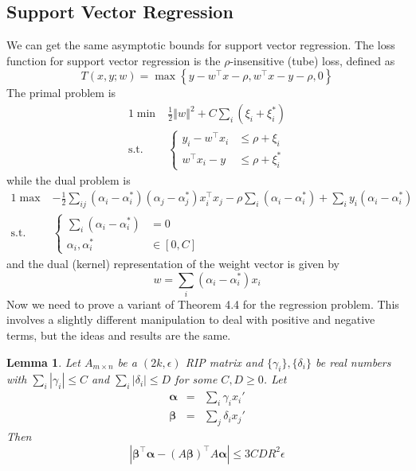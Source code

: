 \documentclass[english]{article}
\theoremstyle{plain}
\newtheorem{lemma}{Lemma}
\begin{document}
\subsection{Support Vector Regression}
We can get the same asymptotic bounds for support vector regression.
The loss function for support vector regression is the $\rho$-insensitive
(tube) loss, defined as
\begin{equation}
T(x,y;w)=\max\left\{ y-w^{\top}x-\rho,w^{\top}x-y-\rho,0\right\} \label{eq:epsilon-insensitive}
\end{equation}
The primal problem is
\begin{alignat*}{1}
\min & \frac{1}{2}\left\Vert w\right\Vert ^{2}+C\sum_{i}\left(\xi_{i}+\xi_{i}^{*}\right)\\
\text{s.t.} & \begin{cases}
y_{i}-w^{\top}x_{i} & \leq\rho+\xi_{i}\\
w^{\top}x_{i}-y & \leq\rho+\xi_{i}^{*}
\end{cases}
\end{alignat*}
while the dual problem is
\begin{alignat*}{1}
\max & -\frac{1}{2}\sum_{ij}\left(\alpha_{i}-\alpha_{i}^{*}\right)\left(\alpha_{j}-\alpha_{j}^{*}\right)x_{i}^{\top}x_{j}-\rho\sum_{i}\left(\alpha_{i}-\alpha_{i}^{*}\right)+\sum_{i}y_{i}\left(\alpha_{i}-\alpha_{i}^{*}\right)\\
\text{s.t.} & \begin{cases}
\sum_{i}\left(\alpha_{i}-\alpha_{i}^{*}\right) & =0\\
\alpha_{i},\alpha_{i}^{*} & \in[0,C]
\end{cases}
\end{alignat*}
and the dual (kernel) representation of the weight vector is given
by
\begin{equation}
w=\sum_{i}\left(\alpha_{i}-\alpha_{i}^{*}\right)x_{i}\label{eq:dual-w}
\end{equation}
Now we need to prove a variant of Theorem 4.4 for the regression problem.
This involves a slightly different manipulation to deal with positive
and negative terms, but the ideas and results are the same.
\begin{lemma}
\label{lem:my-theorem-44}Let $A_{m\times n}$ be a $(2k,\epsilon)$
RIP matrix and $\{\gamma_{i}\},\{\delta_{i}\}$ be real numbers with
$\sum_{i}\left|\gamma_{i}\right|\leq C$ and $\sum_{i}\left|\delta_{i}\right|\leq D$
for some $C,D\geq0$. Let
\begin{eqnarray*}
\bm{\alpha} & = & \sum_{i}\gamma_{i}x_{i}'\\
\bm{\beta} & = & \sum_{j}\delta_{i}x_{j}'
\end{eqnarray*}
Then
\[
\left|\bm{\beta}^{\top}\bm{\alpha}-\left(A\bm{\beta}\right)^{\top}A\bm{\alpha}\right|\leq3CDR^{2}\epsilon
\]
\end{lemma}
\end{document}

